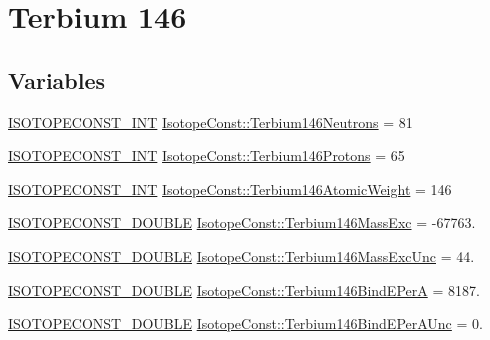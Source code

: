 \hypertarget{group___isotope_const-_terbium-_tb146}{}\section{Terbium 146}
\label{group___isotope_const-_terbium-_tb146}
\subsection*{Variables}
\begin{DoxyCompactItemize}
\item 
\mbox{\hyperlink{group___isotope_const-_macros_ga5f18360b3e99483a35c32d789e62621c}{I\+S\+O\+T\+O\+P\+E\+C\+O\+N\+S\+T\+\_\+\+I\+NT}} \mbox{\hyperlink{group___isotope_const-_terbium-_tb146_gaf53614721eeae856d7c1672ee1fe7197}{Isotope\+Const\+::\+Terbium146\+Neutrons}} = 81
\item 
\mbox{\hyperlink{group___isotope_const-_macros_ga5f18360b3e99483a35c32d789e62621c}{I\+S\+O\+T\+O\+P\+E\+C\+O\+N\+S\+T\+\_\+\+I\+NT}} \mbox{\hyperlink{group___isotope_const-_terbium-_tb146_gada1f268b791e3e0156932a975a6ba73a}{Isotope\+Const\+::\+Terbium146\+Protons}} = 65
\item 
\mbox{\hyperlink{group___isotope_const-_macros_ga5f18360b3e99483a35c32d789e62621c}{I\+S\+O\+T\+O\+P\+E\+C\+O\+N\+S\+T\+\_\+\+I\+NT}} \mbox{\hyperlink{group___isotope_const-_terbium-_tb146_gac810fcbfc2b29bb2c0643a1f87700c1c}{Isotope\+Const\+::\+Terbium146\+Atomic\+Weight}} = 146
\item 
\mbox{\hyperlink{group___isotope_const-_macros_ga8f45a7272ce02c0b4c65c44636ed719a}{I\+S\+O\+T\+O\+P\+E\+C\+O\+N\+S\+T\+\_\+\+D\+O\+U\+B\+LE}} \mbox{\hyperlink{group___isotope_const-_terbium-_tb146_gaafed1169eeed8722476c3086c5220f71}{Isotope\+Const\+::\+Terbium146\+Mass\+Exc}} = -\/67763.
\item 
\mbox{\hyperlink{group___isotope_const-_macros_ga8f45a7272ce02c0b4c65c44636ed719a}{I\+S\+O\+T\+O\+P\+E\+C\+O\+N\+S\+T\+\_\+\+D\+O\+U\+B\+LE}} \mbox{\hyperlink{group___isotope_const-_terbium-_tb146_gae719823a8f6f49c35f1b0abe688d7db4}{Isotope\+Const\+::\+Terbium146\+Mass\+Exc\+Unc}} = 44.
\item 
\mbox{\hyperlink{group___isotope_const-_macros_ga8f45a7272ce02c0b4c65c44636ed719a}{I\+S\+O\+T\+O\+P\+E\+C\+O\+N\+S\+T\+\_\+\+D\+O\+U\+B\+LE}} \mbox{\hyperlink{group___isotope_const-_terbium-_tb146_ga345aeb5c1d023137bfc272a6d7250103}{Isotope\+Const\+::\+Terbium146\+Bind\+E\+PerA}} = 8187.
\item 
\mbox{\hyperlink{group___isotope_const-_macros_ga8f45a7272ce02c0b4c65c44636ed719a}{I\+S\+O\+T\+O\+P\+E\+C\+O\+N\+S\+T\+\_\+\+D\+O\+U\+B\+LE}} \mbox{\hyperlink{group___isotope_const-_terbium-_tb146_ga50e54448393b257a221b326f3d83cf3f}{Isotope\+Const\+::\+Terbium146\+Bind\+E\+Per\+A\+Unc}} = 0.

\end{DoxyCompactItemize}
